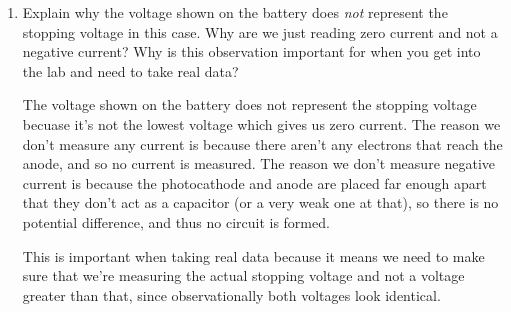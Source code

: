\documentclass[10pt]{article}
\begin{document}
        \begin{enumerate}[resume, label=\alph*)]
            \item Explain why the voltage shown on the battery does \textit{not} represent the stopping voltage in this case. Why are we just reading zero current and not a negative current? Why is this observation important for when you get into the lab and need to take real data?
            
            \begin{solution}
                The voltage shown on the battery does not represent the stopping voltage becuase it's not the lowest voltage which gives us zero current. The reason we don't measure any current is because there aren't any electrons that reach the anode, and so no current is measured. The reason we don't measure negative current is because the photocathode and anode are placed far enough apart that they don't act as a capacitor (or a very weak one at that), so there is no potential difference, and thus no circuit is formed.

                This is important when taking real data because it means we need to make sure that we're measuring the actual stopping voltage and not a voltage greater than that, since observationally both voltages look identical.
            \end{solution}
        \end{enumerate}
\end{document}
